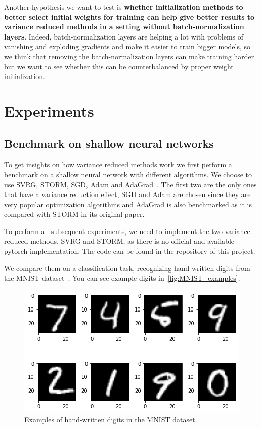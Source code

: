 \documentclass[a4paper,11pt,oneside]{report}
\begin{document}
Another hypothesis we want to test is \textbf{whether initialization methods to better select initial weights for training can help give better results to variance reduced methods in a setting without batch-normalization layers}. Indeed, batch-normalization layers are helping a lot with problems of vanishing and exploding gradients and make it easier to train bigger models, so we think that removing the batch-normalization layers can make training harder but we want to see whether this can be counterbalanced by proper weight initialization.


\chapter{Experiments}
\section{Benchmark on shallow neural networks}
To get insights on how variance reduced methods work we first perform a benchmark on a shallow neural network with different algorithms. We choose to use SVRG, STORM, SGD, Adam and AdaGrad~\cite{JMLR:v12:duchi11a}. The first two are the only ones that have a variance reduction effect, SGD and Adam are chosen since they are very popular optimization algorithms and AdaGrad is also benchmarked as it is compared with STORM in its original paper. 

To perform all subsequent experiments, we need to implement the two variance reduced methods, SVRG and STORM, as there is no official and available pytorch implementation. The code can be found in the repository of this project.

We compare them on a classification task, recognizing hand-written digits from the MNIST dataset~\cite{lecun2010mnist}. You can see example digits in~\autoref{fig:MNIST_examples}. 

\begin{figure}
    \centering
    \includegraphics[scale=0.5]{figures/MNIST_example.png}
    \caption{Examples of hand-written digits in the MNIST dataset.}
    \label{fig:MNIST_examples}
\end{figure}
\end{document}
